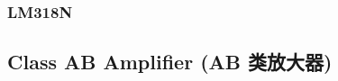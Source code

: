 \documentclass[UTF8]{report}
\begin{document}
\subsection{LM318N}

\section{Class AB Amplifier (AB 类放大器)}

\chapter{}\thispagestyle{fancy}

















\renewcommand{\bibname}{Reference}  %
\nocite{*}

\thispagestyle{fancy} 
\end{document}
